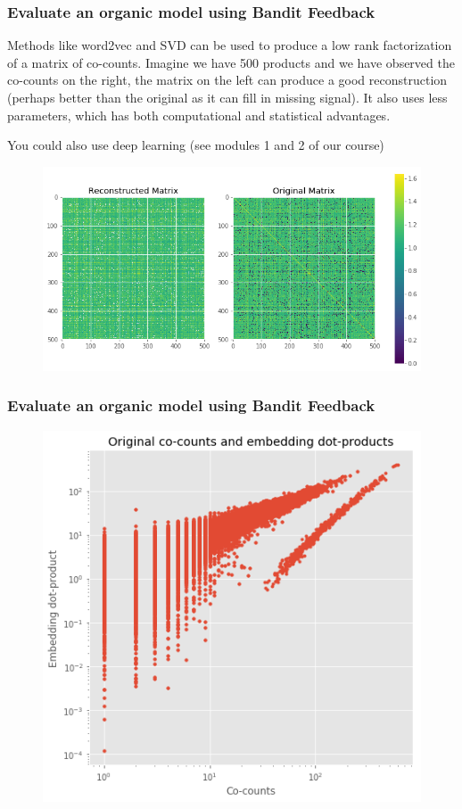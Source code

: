 \begin{frame}
  \frametitle{Evaluate an organic model using Bandit Feedback}

  Methods like word2vec and SVD can be used to produce a low rank factorization of a matrix of co-counts.  Imagine we have 500 products and we have observed the co-counts on the right, the matrix on the left can produce a good reconstruction (perhaps better than the original as it can fill in missing signal).  It also uses less parameters, which has both computational and statistical advantages.

  You could also use deep learning (see modules 1 and 2 of our course)

  \begin{figure}[h!]
\includegraphics[scale=0.4]{images/evalorganicwithbandit0.png}
\centering
\label{motex1}
\end{figure}
\end{frame}


\begin{frame}
  \frametitle{Evaluate an organic model using Bandit Feedback}
\begin{figure}[h!]
\includegraphics[scale=0.4]{images/evalorganicwithbandit1.png}
\centering
\label{motex1}
\end{figure}
\end{frame}


